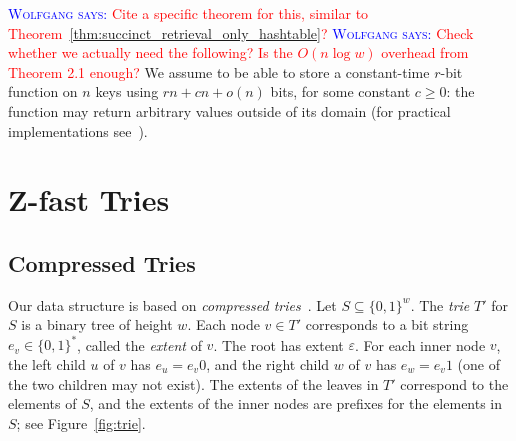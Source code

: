 \documentclass[a4paper,11pt]{article}
\newcommand{\eps}{\varepsilon}
\newcommand{\?}{\mskip1.5mu}
\newcommand{\aremark}[3]{\textcolor{blue}{\textsc{#1 #2:}}
  \textcolor{red}{\textsf{#3}}}
\newcommand{\wolfgang}[2][says]{\aremark{Wolfgang}{#1}{#2}}
\begin{document}
\wolfgang{Cite a specific theorem for this, similar to 
  Theorem~\ref{thm:succinct_retrieval_only_hashtable}?}
\wolfgang{Check whether we actually need the following? Is the
$O(n \log w)$ overhead from Theorem 2.1 enough?}
We assume to be able to store a constant-time $r$-bit function on 
$n$ keys using $rn+cn +o(n)$ bits, for some constant $c\geq 0$: the 
function may return arbitrary values outside of its domain (for 
practical implementations see~\cite{BelazzouguiBoPaVi11}).

\section{Z-fast Tries} 

\subsection{Compressed Tries}
Our data structure is based on \emph{compressed
tries}~\cite{CormenLeRiSt09,Knuth98}. 
Let $S \subseteq \{0, 1\}^w$. The \emph{trie} $T'$ for $S$ 
is a binary tree of height $w$. Each node $v \in T'$ corresponds
to a bit string $e_v \in \{0,1\}^*$, called the \emph{extent} of $v$. 
The root has extent $\eps$. For each inner node $v$, the left child 
$u$ of $v$  has $e_u = e_v0$, and the right child $w$ of $v$ has 
$e_w = e_v1$ (one of the two children may not exist). The extents of
the leaves in $T'$ correspond to the elements of $S$, and the extents of the 
inner nodes are prefixes for the elements in $S$; see 
Figure~\ref{fig:trie}.
\end{document}
